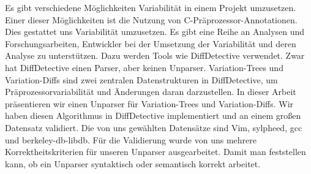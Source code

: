 Es gibt verschiedene Möglichkeiten Variabilität in einem Projekt umzusetzen. Einer dieser Möglichkeiten ist die Nutzung von C-Präprozessor-Annotationen. Dies gestattet uns Variabilität umzusetzen. Es gibt eine Reihe an Analysen und Forschungsarbeiten, Entwickler bei der Umsetzung der Variabilität und deren Analyse zu unterstützen. Dazu werden Tools wie DiffDetective verwendet. Zwar hat DiffDetective einen Parser, aber keinen Unparser. Variation-Trees und Variation-Diffs sind zwei zentralen Datenstrukturen in DiffDetective, um Präprozessorvariabilität und Änderungen daran darzustellen. In dieser Arbeit präsentieren wir einen Unparser für Variation-Trees und Variation-Diffs. Wir haben diesen Algorithmus in DiffDetective implementiert und an einem großen Datensatz validiert. Die von uns gewählten Datensätze sind Vim, sylpheed, gcc und berkeley-db-libdb. Für die Validierung wurde von uns mehrere Korrektheitskriterien für unseren Unparser ausgearbeitet. Damit man feststellen kann, ob ein Unparser syntaktisch oder semantisch korrekt arbeitet.